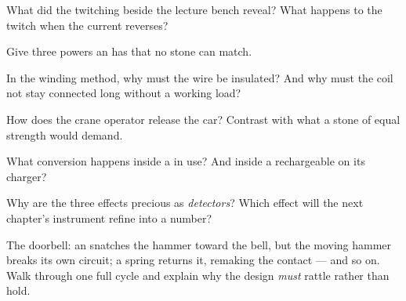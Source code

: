 \begin{exercise}[$\star$]\label{exo:g8:electric-current-effects:3}
What did the twitching  beside the lecture bench reveal?
What happens to the twitch when the current reverses?
\end{exercise}

\begin{exercise}[$\star$]\label{exo:g8:electric-current-effects:4}
Give three powers an  has that no stone  can
match.
\end{exercise}

\begin{exercise}[$\star$]\label{exo:g8:electric-current-effects:5}
In the winding method, why must the wire be insulated? And why
must the coil not stay connected long without a working load?
\end{exercise}

\begin{exercise}[$\star$]\label{exo:g8:electric-current-effects:6}
How does the crane operator release the car? Contrast with what
a stone  of equal strength would demand.
\end{exercise}

\begin{exercise}[$\star$]\label{exo:g8:electric-current-effects:7}
What  conversion happens inside a  in use? And
inside a rechargeable  on its charger?
\end{exercise}

\begin{exercise}[$\star$]\label{exo:g8:electric-current-effects:8}
Why are the three effects precious as \emph{detectors}? Which
effect will the next chapter's instrument refine into a
number?
\end{exercise}

\begin{exercise}[$\star\star$]\label{exo:g8:electric-current-effects:9}
The doorbell: an  snatches the hammer toward the
bell, but the moving hammer breaks its own circuit; a spring
returns it, remaking the contact --- and so on. Walk through
one full cycle and explain why the design \emph{must} rattle
rather than hold.
\end{exercise}

